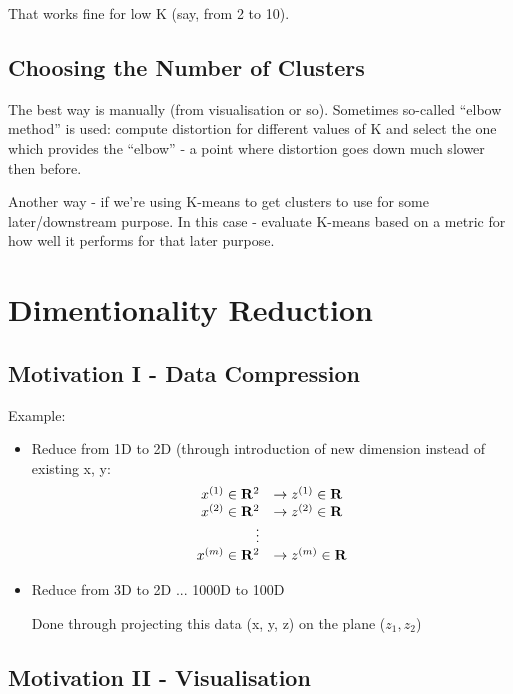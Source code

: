 \documentclass{scrartcl}
\begin{document}
That works fine for low K (say, from 2 to 10).

\subsection{Choosing the Number of Clusters}
\label{sec:13-5}

The best way is manually (from visualisation or so). Sometimes
so-called ``elbow method'' is used: compute distortion for different
values of K and select the one which provides the ``elbow'' - a point
where distortion goes down much slower then before.

Another way - if we're using K-means to get clusters to use for some
later/downstream purpose. In this case - evaluate K-means based on a
metric for how well it performs for that later purpose.

\section{Dimentionality Reduction}
\label{sec:14}

\subsection{Motivation I - Data Compression}
\label{sec:14-1}
Example:
\begin{itemize}
\item Reduce from 1D to 2D (through introduction of new dimension
  instead of existing x, y:
  \[
  \begin{array}[l]{rl}
    x^{(1)} \in \mathbf{R}^2 & \rightarrow z^{(1)} \in
    \mathbf{R} \\
    x^{(2)} \in \mathbf{R}^2 & \rightarrow z^{(2)} \in
    \mathbf{R} \\
    \vdots \\
    x^{(m)} \in \mathbf{R}^2 & \rightarrow z^{(m)} \in
    \mathbf{R} \\
  \end{array}
  \]
\item Reduce from 3D to 2D ... 1000D to 100D

  Done through projecting this data (x, y, z) on the plane ($z_1,
  z_2$)
\end{itemize}

\subsection{Motivation II - Visualisation}
\label{sec:14-2}
\end{document}
